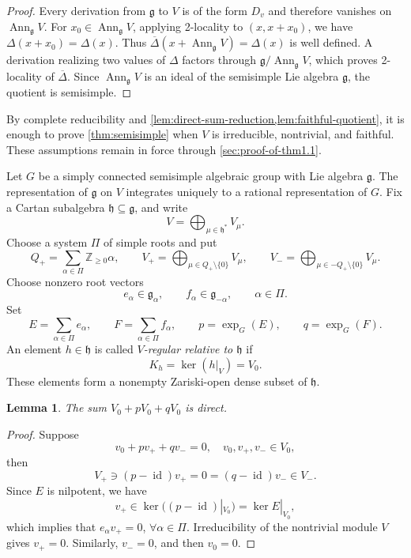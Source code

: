 \documentclass[12pt,reqno]{amsart}
\newtheorem{lemma}[theorem]{Lemma}
\theoremstyle{definition}
\theoremstyle{remark}
\numberwithin{equation}{section}
\newcommand{\g}{\mathfrak{g}}
\newcommand{\tori}{\mathfrak{h}}
\newcommand{\id}{\operatorname{id}}
\begin{document}
\begin{proof}
Every derivation from \(\g\) to \(V\) is of the form \(D_v\) and therefore vanishes on
\(\operatorname{Ann}_\g V\).  For \(x_0\in\operatorname{Ann}_\g V\), applying 2-locality to
\((x,x+x_0)\), we have \(\Delta(x+x_0)=\Delta(x)\).  Thus
\(\overline\Delta(x+\operatorname{Ann}_\g V)=\Delta(x)\) is well defined.  A derivation
realizing two values of \(\Delta\) factors through \(\g/\operatorname{Ann}_\g V\), which
proves 2-locality of \(\overline\Delta\).  Since \(\operatorname{Ann}_\g V\) is an ideal
of the semisimple Lie algebra \(\g\), the quotient is semisimple.
\end{proof}

By complete reducibility and \cref{lem:direct-sum-reduction,lem:faithful-quotient}, it is enough to prove
\cref{thm:semisimple} when \(V\) is irreducible, nontrivial, and faithful.
These assumptions remain in force through \cref{sec:proof-of-thm1.1}.

Let \(G\) be a simply connected semisimple algebraic
group with Lie algebra \(\g\).  The representation of \(\g\) on \(V\)
integrates uniquely to a rational representation of \(G\).
Fix a Cartan subalgebra \(\tori\subseteq\g\), and write
\[
  V=\bigoplus_{\mu\in\tori^*}V_\mu.
\]
Choose a system \(\Pi\) of simple roots and put
\[
 Q_+=\sum_{\alpha\in\Pi}\mathbb Z_{\geq0}\alpha,
 \qquad V_+=\bigoplus_{\mu\in Q_+\setminus\{0\}}V_\mu,
 \qquad V_-=\bigoplus_{\mu\in -Q_+\setminus\{0\}}V_\mu.
\]
Choose nonzero root vectors
\[
  e_\alpha\in\g_\alpha,\qquad
  f_\alpha\in\g_{-\alpha},
  \qquad \alpha\in\Pi.
\]
Set
\[
  E=\sum_{\alpha\in\Pi}e_\alpha,
  \qquad
  F=\sum_{\alpha\in\Pi}f_\alpha,
  \qquad
  p=\exp_G(E),
  \qquad
  q=\exp_G(F).
\]
An element \(h\in\tori\) is called \emph{\(V\)-regular relative to
\(\tori\)} if
\[
  K_h=\ker(h|_V)= V_0.
\]
These elements form a nonempty Zariski-open dense subset of \(\tori\).

\begin{lemma}\label{lem:three-spaces}
The sum \(V_0+ pV_0+ qV_0\) is direct.
\end{lemma}

\begin{proof}
Suppose
\[
  v_0+pv_++qv_-=0,
  \quad v_0,v_+,v_-\in V_0,
\]
then
\[
  V_+\ni(p-\id)v_+= 0= (q-\id)v_-\in V_-.
\]
Since \(E\) is nilpotent, we have
\[
  v_+\in \ker((p-\id)|_{V_0})=\ker E|_{V_0},
\]
which implies that \(e_\alpha v_+=0\), \(\forall\alpha\in \Pi\).
Irreducibility of the nontrivial module $V$ gives
\(v_+=0\). Similarly, \(v_-=0\), and then \(v_0=0\).
\end{proof}
\end{document}
